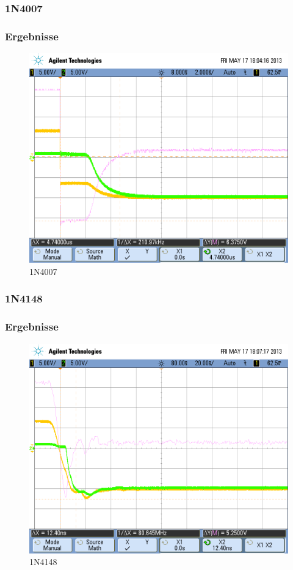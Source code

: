\subsubsection{1N4007}
\begin{frame}
\frametitle{Ergebnisse}
  \begin{figure}
    \includegraphics[width=0.7\columnwidth]{fig/scope_18.png}
    \caption{1N4007}
  \end{figure}
\end{frame}

\subsubsection{1N4148}
\begin{frame}
\frametitle{Ergebnisse}
  \begin{figure}
    \includegraphics[width=0.7\columnwidth]{fig/scope_19.png}
    \caption{1N4148}
  \end{figure}
\end{frame}

